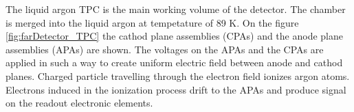 The liquid argon TPC is the main working volume of the detector. The chamber is merged into the liquid argon at tempetature of 89 K. On the figure \ref{fig:farDetector_TPC} the cathod plane assemblies (CPAs) and the anode plane assemblies (APAs) are shown. The voltages on the APAs and the CPAs are applied in such a way to create uniform electric field between anode and cathod planes. Charged particle travelling through the electron field ionizes argon atoms. Electrons induced in the ionization process drift to the APAs and produce signal on the readout electronic elements.


